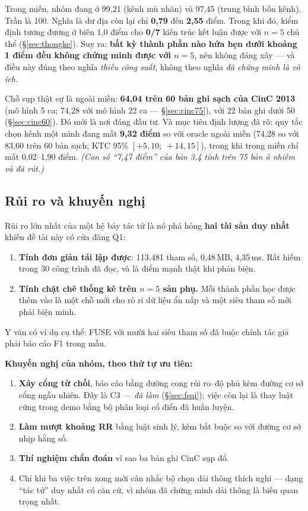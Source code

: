 Trong miền, nhóm đang ở 99,21 (kênh mù nhãn) và 97,45 (trung bình bốn kênh). Trần là 100. Nghĩa là dư địa
còn lại chỉ \textbf{0,79} đến \textbf{2,55} điểm. Trong khi đó, kiểm định tương đương ở biên 1,0 điểm cho
\textbf{0/7} kiến trúc kết luận được với $n = 5$ chủ thể (\S\ref{sec:thongke}). Suy ra:
\textbf{bất kỳ thành phần nào hứa hẹn dưới khoảng 1 điểm đều không chứng minh được với $n = 5$}, nên
không đáng xây --- và điều này đúng theo nghĩa \textit{thiếu công suất}, không theo nghĩa \textit{đã
chứng minh là vô ích}.

Chỗ sụp thật sự là ngoài miền: \textbf{64,04 trên 60 bản ghi sạch của CinC 2013} (mô hình 5 ca; 74,28
với mô hình 22 ca --- \S\ref{sec:cinc75}), với 22 bản ghi dưới 50
(\S\ref{sec:cinc60}). Đó mới là nơi đáng đầu tư. Và mục tiêu định lượng đã rõ: quy tắc chọn kênh một
mình đang mất \textbf{9,32 điểm} so với oracle ngoài miền (74,28 so với 83,60 trên 60 bản sạch; KTC 95\%
$[+5{,}10;\ +14{,}15]$), trong khi trong miền chỉ mất 0,02--1,90 điểm. \textit{(Con số ``7,47 điểm''
của bản 3.4 tính trên 75 bản ô nhiễm và đã rút.)}

\subsection{Rủi ro và khuyến nghị}

\begin{canhbao}[title={Rủi ro lớn nhất không phải tốc độ}]
Rủi ro lớn nhất của một hệ bảy tác tử là nó phá hỏng \textbf{hai tài sản duy nhất} khiến đề tài này có
cửa đăng Q1:
\begin{enumerate}[leftmargin=1.5em,itemsep=2pt]
\item \textbf{Tính đơn giản tái lập được}: 113.481 tham số, 0,48\,MB, 4,35\,ms. Rất hiếm trong 30 công
trình đã đọc, và là điểm mạnh thật khi phản biện.
\item \textbf{Tính chặt chẽ thống kê trên $n = 5$ sản phụ.} Mỗi thành phần học được thêm vào là một chỗ
mới cho rò rỉ dữ liệu ẩn nấp và một siêu tham số mới phải biện minh.
\end{enumerate}
Y văn có ví dụ cụ thể: FUSE với mười hai siêu tham số đã buộc chính tác giả phải báo cáo F1 trong mẫu.
\end{canhbao}

\textbf{Khuyến nghị của nhóm, theo thứ tự ưu tiên:}

\begin{enumerate}[leftmargin=1.8em,itemsep=4pt]
\item \textbf{Xây cổng từ chối}, báo cáo bằng đường cong rủi ro--độ phủ kèm đường cơ sở cổng ngẫu nhiên.
Đây là C3 --- \textit{đã làm} (\S\ref{sec:fsqi}); việc còn lại là thay luật cứng trong demo bằng bộ
phân loại cổ điển đã huấn luyện.
\item \textbf{Làm mượt khoảng RR} bằng luật sinh lý, kèm bắt buộc so với đường cơ sở nhịp hằng số.
\item \textbf{Thí nghiệm chẩn đoán} vì sao ba bản ghi CinC sụp đổ.
\item Chỉ khi ba việc trên xong mới cân nhắc bộ chọn dải thông thích nghi --- dạng ``tác tử'' duy nhất
có căn cứ, vì nhóm đã chứng minh dải thông là biến quan trọng nhất.
\end{enumerate}

